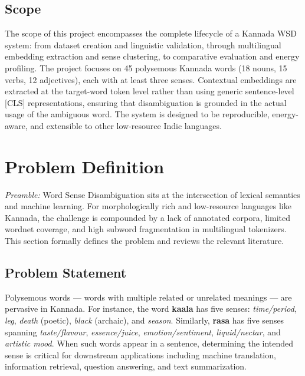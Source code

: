 \documentclass[12pt,a4paper,oneside]{article}
\begin{document}
\subsection{Scope}

The scope of this project encompasses the complete lifecycle of a Kannada WSD system: from dataset creation and linguistic validation, through multilingual embedding extraction and sense clustering, to comparative evaluation and energy profiling. The project focuses on 45 polysemous Kannada words (18 nouns, 15 verbs, 12 adjectives), each with at least three senses. Contextual embeddings are extracted at the target-word token level rather than using generic sentence-level [CLS] representations, ensuring that disambiguation is grounded in the actual usage of the ambiguous word. The system is designed to be reproducible, energy-aware, and extensible to other low-resource Indic languages.

\clearpage

\section{Problem Definition}

\textit{Preamble:} Word Sense Disambiguation sits at the intersection of lexical semantics and machine learning. For morphologically rich and low-resource languages like Kannada, the challenge is compounded by a lack of annotated corpora, limited wordnet coverage, and high subword fragmentation in multilingual tokenizers. This section formally defines the problem and reviews the relevant literature.

\subsection{Problem Statement}

Polysemous words --- words with multiple related or unrelated meanings --- are pervasive in Kannada. For instance, the word \textbf{kaala} has five senses: \textit{time/period}, \textit{leg}, \textit{death} (poetic), \textit{black} (archaic), and \textit{season}. Similarly, \textbf{rasa} has five senses spanning \textit{taste/flavour}, \textit{essence/juice}, \textit{emotion/sentiment}, \textit{liquid/nectar}, and \textit{artistic mood}. When such words appear in a sentence, determining the intended sense is critical for downstream applications including machine translation, information retrieval, question answering, and text summarization.
\end{document}
